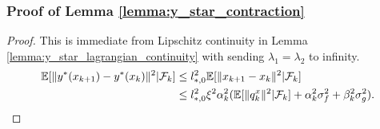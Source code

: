 \subsubsection{Proof of Lemma \ref{lemma:y_star_contraction}} 
    \begin{proof}
    This is immediate from Lipschitz continuity in Lemma \ref{lemma:y_star_lagrangian_continuity} with sending $\lambda_1 = \lambda_2$ to infinity. 
    \begin{align*}
        \mathbb{E}[\|y^*(x_{k+1}) - y^*(x_k)\|^2 | \mathcal{F}_k] &\le l_{*,0}^2 \mathbb{E}[\|x_{k+1} - x_k\|^2 | \mathcal{F}_k] \\
        &\le l_{*,0}^2 \xi^2 \alpha_k^2 (\mathbb{E}[\|q_k^x\|^2|\mathcal{F}_k] + \alpha_k^2 \sigma_f^2 + \beta_k^2 \sigma_g^2). 
    \end{align*}
\end{proof}




